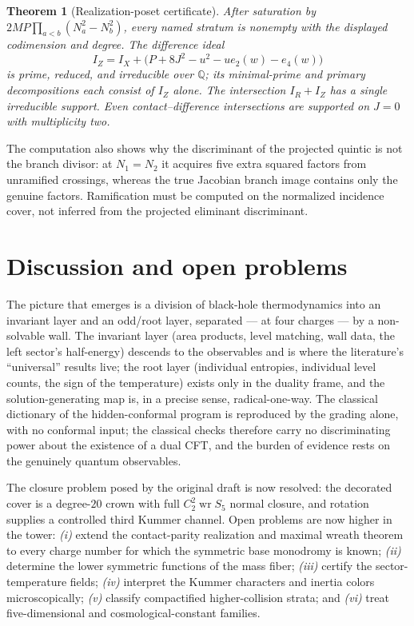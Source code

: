 \documentclass[11pt]{article}
\newtheorem{theorem}{Theorem}[section]
\theoremstyle{definition}
\theoremstyle{remark}
\newcommand{\Q}{\mathbb{Q}}
\newcommand{\wrp}{\mathop{\mathrm{wr}}}
\begin{document}
\begin{theorem}[Realization-poset certificate]
\label{thm:realization}
After saturation by $2MP\prod_{a<b}(N_a^2-N_b^2)$, every named stratum is
nonempty with the displayed codimension and degree.  The difference ideal
\begin{equation}
I_Z=I_X+\bigl(P+8J^2-u^2-u e_2(w)-e_4(w)\bigr)
\label{eq:iz}
\end{equation}
is prime, reduced, and irreducible over $\Q$; its minimal-prime and primary
decompositions each consist of $I_Z$ alone. The intersection $I_R+I_Z$ has a
single irreducible support. Even contact--difference intersections are
supported on $J=0$ with multiplicity two.
\end{theorem}

The computation also shows why the discriminant of the projected quintic is
not the branch divisor: at $N_1=N_2$ it acquires five extra squared factors
from unramified crossings, whereas the true Jacobian branch image contains
only the genuine factors. Ramification must be computed on the normalized
incidence cover, not inferred from the projected eliminant discriminant.
\section{Discussion and open problems}
\label{sec:discussion}

The picture that emerges is a division of black-hole thermodynamics into an
invariant layer and an odd/root layer, separated --- at four charges --- by a
non-solvable wall. The invariant layer (area products, level matching, wall
data, the left sector's half-energy) descends to the observables and is where
the literature's ``universal'' results live; the root layer (individual
entropies, individual level counts, the sign of the temperature) exists only
in the duality frame, and the solution-generating map is, in a precise sense,
radical-one-way. The classical dictionary of the hidden-conformal program is
reproduced by the grading alone, with no conformal input; the classical
checks therefore carry no discriminating power about the existence of a dual
CFT, and the burden of evidence rests on the genuinely quantum observables.

The closure problem posed by the original draft is now resolved: the decorated
cover is a degree-$20$ crown with full $C_2^2\wrp S_5$ normal closure, and
rotation supplies a controlled third Kummer channel. Open problems are now
higher in the tower: \emph{(i)} extend the contact-parity realization and
maximal wreath theorem to every charge number for which the symmetric base
monodromy is known; \emph{(ii)} determine the lower symmetric functions of the
mass fiber; \emph{(iii)} certify the sector-temperature fields; \emph{(iv)}
interpret the Kummer characters and inertia colors microscopically;
\emph{(v)} classify compactified higher-collision strata; and \emph{(vi)}
treat five-dimensional and cosmological-constant families.
\end{document}
